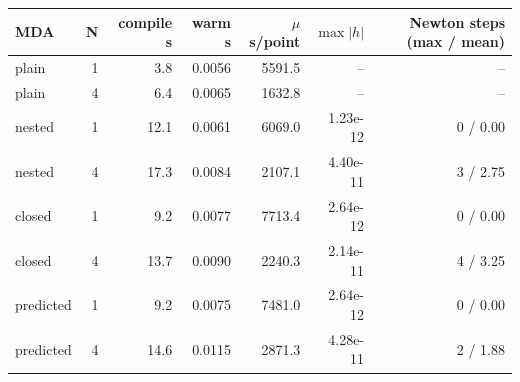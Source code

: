 \begin{tabular}{lrrrrrr}
\toprule
MDA & N & compile s & warm s & $\mu$s/point & $\max|h|$ & Newton steps (max / mean) \\
\midrule
plain & 1 & 3.8 & 0.0056 & 5591.5 & -- & -- \\
plain & 4 & 6.4 & 0.0065 & 1632.8 & -- & -- \\
nested & 1 & 12.1 & 0.0061 & 6069.0 & 1.23e-12 & 0 / 0.00 \\
nested & 4 & 17.3 & 0.0084 & 2107.1 & 4.40e-11 & 3 / 2.75 \\
closed & 1 & 9.2 & 0.0077 & 7713.4 & 2.64e-12 & 0 / 0.00 \\
closed & 4 & 13.7 & 0.0090 & 2240.3 & 2.14e-11 & 4 / 3.25 \\
predicted & 1 & 9.2 & 0.0075 & 7481.0 & 2.64e-12 & 0 / 0.00 \\
predicted & 4 & 14.6 & 0.0115 & 2871.3 & 4.28e-11 & 2 / 1.88 \\
\bottomrule
\end{tabular}
